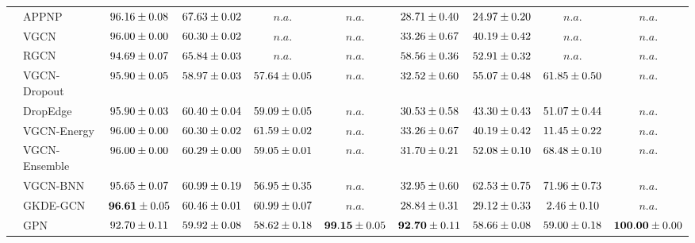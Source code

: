 \begin{table*}[!h]
{\begin{tabular}{ll|cccc|cccc}
        \midrule

        & APPNP & ${96.16\tiny \pm 0.08}$ & ${67.63\tiny \pm 0.02}$ & $n.a.$ & $n.a.$ & ${28.71\tiny \pm 0.40}$ & ${24.97\tiny \pm 0.20}$ & $n.a.$ & $n.a.$\\
        & VGCN & ${96.00\tiny \pm 0.00}$ & ${60.30\tiny \pm 0.02}$ & $n.a.$ & $n.a.$ & ${33.26\tiny \pm 0.67}$ & ${40.19\tiny \pm 0.42}$ & $n.a.$ & $n.a.$\\
        & RGCN & ${94.69\tiny \pm 0.07}$ & ${65.84\tiny \pm 0.03}$ & $n.a.$ & $n.a.$ & ${58.56\tiny \pm 0.36}$ & ${52.91\tiny \pm 0.32}$ & $n.a.$ & $n.a.$\\
        & VGCN-Dropout & ${95.90\tiny \pm 0.05}$ & ${58.97\tiny \pm 0.03}$ & ${57.64\tiny \pm 0.05}$ & $n.a.$ & ${32.52\tiny \pm 0.60}$ & ${55.07\tiny \pm 0.48}$ & ${61.85\tiny \pm 0.50}$ & $n.a.$\\
        & DropEdge & ${95.90\tiny \pm 0.03}$ & ${60.40\tiny \pm 0.04}$ & ${59.09\tiny \pm 0.05}$ & $n.a.$ & ${30.53\tiny \pm 0.58}$ & ${43.30\tiny \pm 0.43}$ & ${51.07\tiny \pm 0.44}$ & $n.a.$\\
        & VGCN-Energy & ${96.00\tiny \pm 0.00}$ & ${60.30\tiny \pm 0.02}$ & ${61.59\tiny \pm 0.02}$ & $n.a.$ & ${33.26\tiny \pm 0.67}$ & ${40.19\tiny \pm 0.42}$ & ${11.45\tiny \pm 0.22}$ & $n.a.$\\
        & VGCN-Ensemble & ${96.00\tiny \pm 0.00}$ & ${60.29\tiny \pm 0.00}$ & ${59.05\tiny \pm 0.01}$ & $n.a.$ & ${31.70\tiny \pm 0.21}$ & ${52.08\tiny \pm 0.10}$ & ${68.48\tiny \pm 0.10}$ & $n.a.$\\
        & VGCN-BNN & ${95.65\tiny \pm 0.07}$ & ${60.99\tiny \pm 0.19}$ & ${56.95\tiny \pm 0.35}$ & $n.a.$ & ${32.95\tiny \pm 0.60}$ & ${62.53\tiny \pm 0.75}$ & ${{71.96}\tiny \pm 0.73}$ & $n.a.$\\
        & GKDE-GCN & ${\mathbf{96.61}\tiny \pm 0.05}$ & ${60.46\tiny \pm 0.01}$ & ${60.99\tiny \pm 0.07}$ & $n.a.$ & ${28.84\tiny \pm 0.31}$ & ${29.12\tiny \pm 0.33}$ & ${2.46\tiny \pm 0.10}$ & $n.a.$\\
        & GPN & ${92.70\tiny \pm 0.11}$ & ${59.92\tiny \pm 0.08}$ & ${58.62\tiny \pm 0.18}$ & ${\mathbf{99.15}\tiny \pm 0.05}$ & ${\mathbf{92.70}\tiny \pm 0.11}$ & ${58.66\tiny \pm 0.08}$ & ${59.00\tiny \pm 0.18}$ & ${\mathbf{100.00}\tiny \pm 0.00}$\\


\end{tabular}}
\end{table*}
